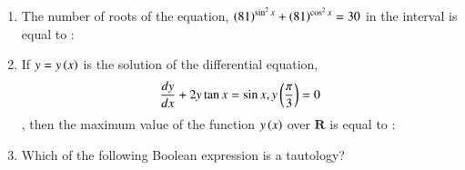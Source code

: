 \documentclass[journal]{IEEEtran}
\numberwithin{equation}{enumi}
\numberwithin{figure}{enumi}
\begin{document}
\begin{enumerate}
    \hfill{}
    \begin{enumerate}
    \end{enumerate}

    \item 
    The number of roots of the equation, $\left(81\right)^{\sin^2{x}} + \left(81\right)^{\cos^2{x}} = 30$ in the interval  is equal to : 
    
    \hfill{}
    \begin{enumerate}
    \end{enumerate}

    \item 
    If $y = y\left(x\right)$ is the solution of the differential equation, 
    \begin{align*}
        \frac{dy}{dx} + 2y\tan{x} = \sin{x}, y\left(\frac{\pi}{3}\right) = 0
    \end{align*}, then the maximum value of the function $y\left(x\right)$ over $\mathbf{R}$ is equal to :
    
    \hfill{}
    \begin{enumerate}
    \end{enumerate}

    \item 
    Which of the following Boolean expression is a tautology?
    \hfill{}
    \begin{enumerate}
    \end{enumerate}


\end{enumerate}
\end{document}
